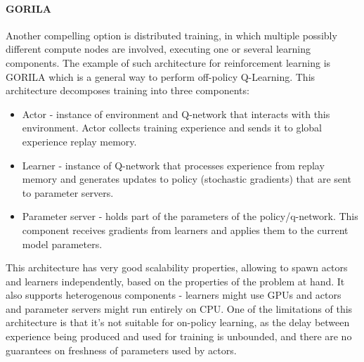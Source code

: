 \paragraph{GORILA}
Another compelling option is distributed training, in which multiple possibly different compute
nodes are involved, executing one or several learning components. The example of such architecture
for reinforcement learning is GORILA \cite{nair2015massively} which is a general way to perform off-policy
Q-Learning. This architecture decomposes training into three components:
\begin{itemize}
    \item Actor - instance of environment and Q-network that interacts with this environment.
        Actor collects training experience and sends it to global experience replay memory.

    \item Learner - instance of Q-network that processes experience from replay memory and
        generates updates to policy (stochastic gradients) that are sent to parameter servers.

    \item Parameter server - holds part of the parameters of the policy/q-network. This component
        receives gradients from learners and applies them to the current model parameters.
\end{itemize}

This architecture has very good scalability properties, allowing to spawn actors and learners
independently, based on the properties of the problem at hand. It also supports heterogenous
components - learners might use GPUs and actors and parameter servers might run entirely on CPU.
One of the limitations of this architecture is that it's not suitable for on-policy learning,
as the delay between experience being produced and used for training is unbounded, and there
are no guarantees on freshness of parameters used by actors.


